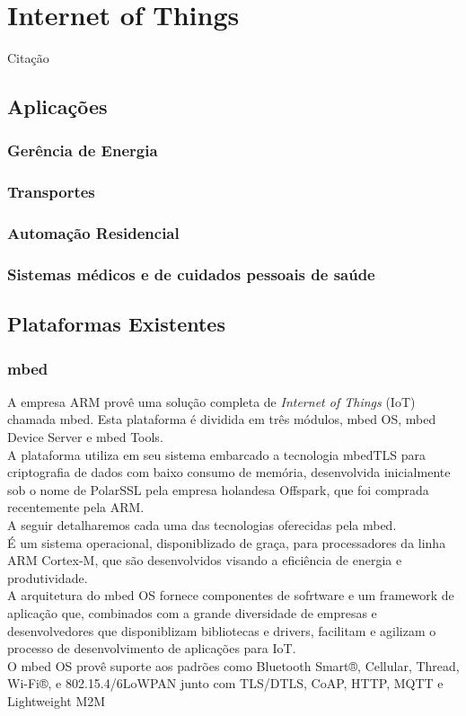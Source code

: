 \section{Internet of Things}
\label{sec:IoT}
Citação~\cite{COMPaaS}

\subsection{Aplicações}
\label{sec:IoTAp}
\subsubsection{Gerência de Energia}
\subsubsection{Transportes}
\subsubsection{Automação Residencial}
\subsubsection{Sistemas médicos e de cuidados pessoais de saúde}

\subsection{Plataformas Existentes}
\label{sec:IoTPlataformas}

\subsubsection{mbed}
A empresa ARM provê uma solução completa de \textit{Internet of Things} (IoT) chamada mbed\cite{mbed}. Esta plataforma é dividida em três módulos, mbed OS, mbed Device Server e mbed Tools.\\
A plataforma utiliza em seu sistema embarcado a tecnologia mbedTLS para criptografia de dados com baixo consumo de memória, desenvolvida inicialmente sob o nome de PolarSSL pela empresa holandesa Offspark, que foi comprada recentemente pela ARM.\\
A seguir detalharemos cada uma das tecnologias oferecidas pela mbed.\\

É um sistema operacional, disponiblizado de graça, para processadores da linha ARM Cortex-M, que são desenvolvidos visando a eficiência de energia e produtividade.\\
A arquitetura do mbed OS fornece componentes de sofrtware e um framework de aplicação que, combinados com a grande diversidade de empresas e desenvolvedores que disponiblizam bibliotecas e drivers, facilitam e agilizam o processo de desenvolvimento de aplicações para IoT.\\
O mbed OS provê suporte aos padrões como Bluetooth Smart®, Cellular, Thread, Wi-Fi®, e 802.15.4/6LoWPAN junto com TLS/DTLS, CoAP, HTTP, MQTT e Lightweight M2M

